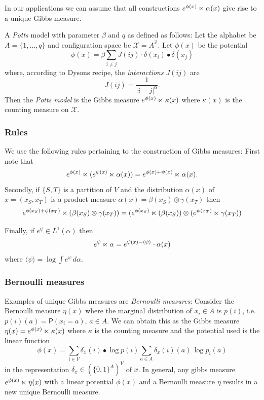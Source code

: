 \documentclass[11pt, a4paper, oneside]{article}
\theoremstyle{definition}
\theoremstyle{remark}
\renewcommand{\d}{\,d}
\providecommand{\ZZ}{\mathbb{Z}}
\providecommand{\mscr}{\mathscr}
\renewcommand{\P}{\mathsf{P}}
\def\X{\mscr X}
\begin{document}
In our applications we can assume that all constructions
$e^{\phi(x)}\ltimes \alpha(x)$ give rise to a unique Gibbs measure.

A \emph{Potts} model with parameter $\beta$ and $q$ as defined as follows: Let
the alphabet be $A=\{1,\dots,q\}$ and configuration space be $\X=A^\ZZ$. Let
$\phi(x)$ be the potential
\begin{equation} \label{eq:Potts}
  \phi(x)=\beta \sum_{i\not=j} J(ij) \cdot \delta(x_i) \bullet \delta(x_j)
\end{equation}
where, according to Dysons recipe, the \emph{interactions} $J(ij)$ are
\begin{equation} \label{eq:Dyson}
  J(ij)=\frac1{|i-j|^\alpha}.
\end{equation}
Then the \emph{Potts model} is the Gibbs measure $e^{\phi(x)}\ltimes\kappa(x)$
where $\kappa(x)$ is the counting measure on $\X$.

\subsubsection{Rules}
We use the following rules pertaining to the construction of Gibbs measures:
First note that
\begin{equation}\label{eq:additive}
  e^{\phi(x)} \ltimes (e^{\psi(x)} \ltimes \alpha(x))
  = e^{\phi(x)+\psi(x)} \ltimes \alpha(x).
\end{equation}
Secondly, if $\{S,T\}$ is a partition of $V$ and the distribution $\alpha(x)$ of
$x=(x_{S},x_{T})$ is a product measure
$\alpha(x) = \beta(x_{S}) \otimes \gamma({x_{T}})$ then
\begin{equation}\label{eq:product}
  e^{\phi(x_{S})+\psi(x_{T})} \ltimes (\beta(x_S) \otimes \gamma(x_T)) =
  (e^{\phi(x_{S})} \ltimes (\beta(x_S)) \otimes (e^{\psi(x_T)}\ltimes \gamma(x_T))
\end{equation}

Finally, if $e^\psi\in L^1(\alpha)$ then
\begin{equation}\label{eq:normalisation}
  e^{\psi}  \ltimes \alpha = e^{\psi(x) - \langle\psi\rangle} \cdot \alpha(x)
\end{equation}
where $\langle \psi \rangle = \log \int e^{\psi}\d\alpha$.


\subsubsection{Bernoulli measures}
Examples of unique Gibbs measures are \emph{Bernoulli measures}: Consider the
Bernoulli measure $\eta(x)$ where the marginal distribution of $x_i\in A$ is
$p(i)$, i.e. $p(i)(a)=\P(x_i=a)$, $a\in A$. We can obtain this as the Gibbs
measure $\eta(x)=e^{\phi(x)} \ltimes \kappa(x)$ where $\kappa$ is the counting
measure and the potential used is the linear function
$$ \phi(x) = \sum_{i\in V} \delta_x(i) \bullet \log p(i)\sum_{a\in A} \delta_x(i)(a)\,\log p_i(a) $$
in the representation $\delta_x \in (\{0,1\}^A)^V$ of $x$. In general, any
gibbs measure $e^{\phi(x)}\ltimes \eta(x)$ with a linear potential $\phi(x)$ and
a Bernoulli measure $\eta$ results in a new unique Bernoulli measure.
\end{document}
